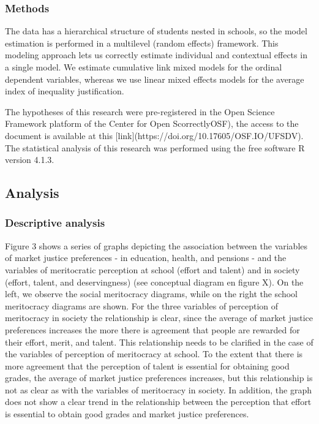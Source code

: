 \documentclass[
  letterpaper,
  DIV=11,
  numbers=noendperiod]{scrartcl}
\begin{document}
\subsubsection{Methods}\label{methods-1}

The data has a hierarchical structure of students nested in schools, so
the model estimation is performed in a multilevel (random effects)
framework. This modeling approach lets us correctly estimate individual
and contextual effects in a single model. We estimate cumulative link
mixed models for the ordinal dependent variables, whereas we use linear
mixed effects models for the average index of inequality justification.

The hypotheses of this research were pre-registered in the Open Science
Framework platform of the Center for Open ScorrectlyOSF), the access to
the document is available at this
{[}link{]}(https://doi.org/10.17605/OSF.IO/UFSDV). The statistical
analysis of this research was performed using the free software R
version 4.1.3.

\subsection{Analysis}\label{analysis}

\subsubsection{Descriptive analysis}\label{descriptive-analysis}

Figure 3 shows a series of graphs depicting the association between the
variables of market justice preferences - in education, health, and
pensions - and the variables of meritocratic perception at school
(effort and talent) and in society (effort, talent, and deservingness)
(see conceptual diagram en figure X). On the left, we observe the social
meritocracy diagrams, while on the right the school meritocracy diagrams
are shown. For the three variables of perception of meritocracy in
society the relationship is clear, since the average of market justice
preferences increases the more there is agreement that people are
rewarded for their effort, merit, and talent. This relationship needs to
be clarified in the case of the variables of perception of meritocracy
at school. To the extent that there is more agreement that the
perception of talent is essential for obtaining good grades, the average
of market justice preferences increases, but this relationship is not as
clear as with the variables of meritocracy in society. In addition, the
graph does not show a clear trend in the relationship between the
perception that effort is essential to obtain good grades and market
justice preferences.
\end{document}
